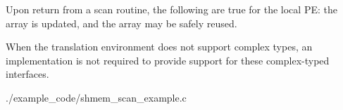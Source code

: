 \begin{apidefinition}
{  Upon return from a scan routine, the following are true for the
  local \ac{PE}: the \dest{} array is updated, and the \source{} array
  may be safely reused.

  When the \Cstd translation environment does not support complex
  types, an \openshmem implementation is not required to provide
  support for these complex-typed interfaces.
}


\begin{apiexamples}

  {./example_code/shmem_scan_example.c}
  {}

\end{apiexamples}

\end{apidefinition}
